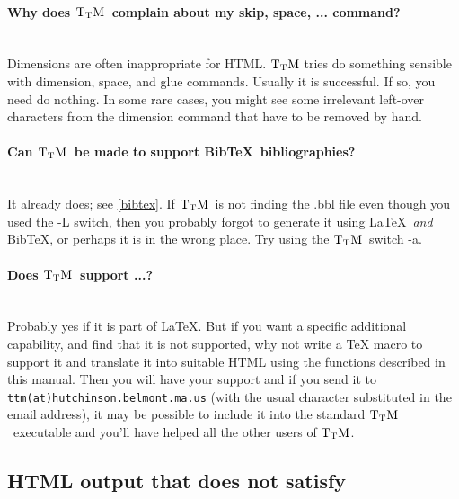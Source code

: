 \documentclass[12pt]{article}
\def\TtM{$\rm{}T_TH$}
\def\TtM{$\rm{}T_TM$}%
\begin{document}
\paragraph{Why does \TtM\ complain about my skip, space, ... command?}\leavevmode\\ 
Dimensions are often inappropriate for HTML. \TtM
tries do something sensible with dimension, space, and glue
commands. Usually it is successful. If so, you need do nothing. In
some rare cases, you might see some irrelevant left-over characters
from the dimension command that have to be removed by hand.

\paragraph{Can \TtM\ be made to support Bib\TeX\ bibliographies?}\leavevmode\\
It already does; see \ref{bibtex}. If \TtM\ is not finding the .bbl file
even though you used the -L switch, then you probably forgot to
generate it using \LaTeX\ \emph{and} Bib\TeX, or perhaps it is in the
wrong place. Try using the \TtM\ switch -a.  

\paragraph{Does \TtM\ support ...?}\leavevmode\\ Probably yes if it is part
of \LaTeX. But if you want a specific additional capability, and find
that it is not supported, why not write a TeX macro to support it and
translate it into suitable HTML using the functions described in this
manual. Then you will have your support and if you send it to
\verb!ttm(at)hutchinson.belmont.ma.us! (with the usual character
substituted in the email address), it may be possible to include it
into the standard \TtM\ executable and you'll have helped all the
other users of \TtM.

\subsection{HTML output that does not satisfy}

\label{headbody}
\end{document}
